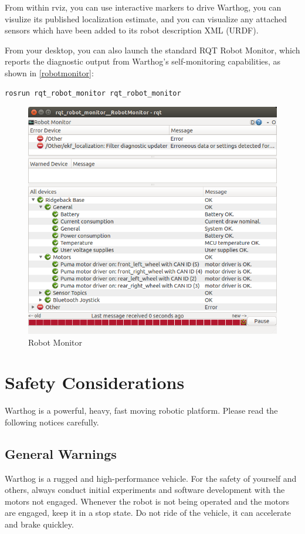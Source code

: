 \documentclass[]{clearpath-latex/clearpath-manual}
\begin{document}
From within rviz, you can use interactive markers to drive Warthog, you can visulize its published localization estimate, and you can visualize any attached sensors which have been added to its robot description XML (URDF).

\pagebreak[4]

From your desktop, you can also launch the standard RQT Robot Monitor, which reports the diagnostic output from Warthog's self-monitoring capabilities, as shown in \autoref{robotmonitor}:

\begin{lstlisting}
rosrun rqt_robot_monitor rqt_robot_monitor
\end{lstlisting}

\begin{figure}[!htb]
  \centering
  \includegraphics[width=0.75\linewidth]{rqt_robot_monitor.png}
  \caption{Robot Monitor}
  \label{robotmonitor}
\end{figure}


\section{Safety Considerations}

Warthog is a powerful, heavy, fast moving robotic platform. Please read the following notices carefully.

\subsection{General Warnings}

Warthog is a rugged and high-performance vehicle. For the safety of yourself and others, always conduct initial experiments and software development with the motors not engaged.  Whenever the robot is not being operated and the motors are engaged, keep it in a stop state.  Do not ride of the vehicle, it can accelerate and brake quickley.
\end{document}
